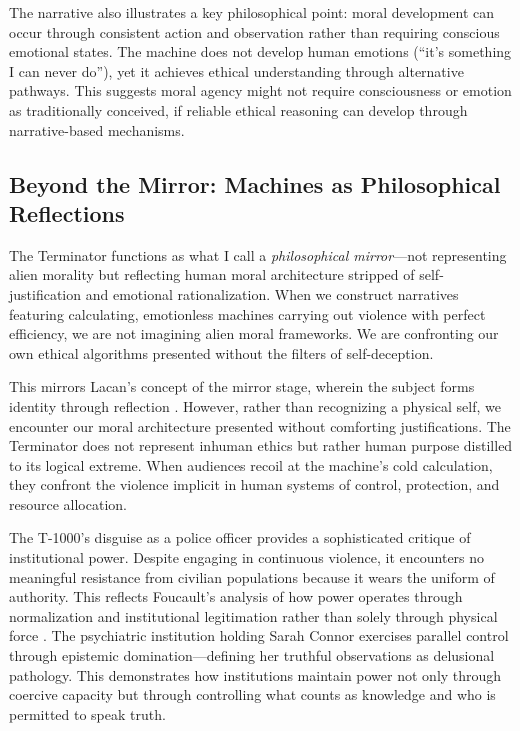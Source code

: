 \documentclass[12pt]{article}
\begin{document}
The narrative also illustrates a key philosophical point: moral development can occur through consistent action and observation rather than requiring conscious emotional states. The machine does not develop human emotions (``it's something I can never do''), yet it achieves ethical understanding through alternative pathways. This suggests moral agency might not require consciousness or emotion as traditionally conceived, if reliable ethical reasoning can develop through narrative-based mechanisms.

\subsection{Beyond the Mirror: Machines as Philosophical Reflections}

The Terminator functions as what I call a \textit{philosophical mirror}---not representing alien morality but reflecting human moral architecture stripped of self-justification and emotional rationalization. When we construct narratives featuring calculating, emotionless machines carrying out violence with perfect efficiency, we are not imagining alien moral frameworks. We are confronting our own ethical algorithms presented without the filters of self-deception.

This mirrors Lacan's concept of the mirror stage, wherein the subject forms identity through reflection \citep{lacan1949mirror}. However, rather than recognizing a physical self, we encounter our moral architecture presented without comforting justifications. The Terminator does not represent inhuman ethics but rather human purpose distilled to its logical extreme. When audiences recoil at the machine's cold calculation, they confront the violence implicit in human systems of control, protection, and resource allocation.

The T-1000's disguise as a police officer provides a sophisticated critique of institutional power. Despite engaging in continuous violence, it encounters no meaningful resistance from civilian populations because it wears the uniform of authority. This reflects Foucault's analysis of how power operates through normalization and institutional legitimation rather than solely through physical force \citep{foucault1975discipline}. The psychiatric institution holding Sarah Connor exercises parallel control through epistemic domination---defining her truthful observations as delusional pathology. This demonstrates how institutions maintain power not only through coercive capacity but through controlling what counts as knowledge and who is permitted to speak truth.
\end{document}
